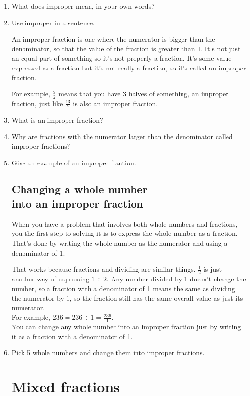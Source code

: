 \documentclass[14pt]{article}
\begin{document}
\begin{enumerate}
\item What does improper mean, in your own words?
\item Use improper in a sentence.

An improper fraction is one where the numerator is bigger than the denominator, so that the value of the fraction is greater than 1. It's not just an equal part of something so it's not properly a fraction. It's some value expressed as a fraction but it's not really a fraction, so it's called an improper fraction.

For example, $\frac{3}{2}$ means that you have 3 halves of something, an improper fraction, just like $\frac{13}{7}$ is also an improper fraction.

\item What is an improper fraction?
\item Why are fractions with the numerator larger than the denominator called improper fractions?
\item Give an example of an improper fraction.

\subsection*{Changing a whole number \\ into an improper fraction}
When you have a problem that involves both whole numbers and fractions, you the first step to solving it is to express the whole number as a fraction. That’s done by writing the whole number as the numerator and using a denominator of 1.

That works because fractions and dividing are similar things. $\frac{1}{2}$ is just another way of expressing $1 \div 2$. Any number divided by 1 doesn't change the number, so a fraction with a denominator of 1 means the same as dividing the numerator by 1, so the fraction still has the same overall value as just its numerator.\\

For example, $236 = 236 \div 1 = \frac{236}{1}$.\\

You can change any whole number into an improper fraction just by writing it as a fraction with a denominator of 1.\\

\item Pick 5 whole numbers and change them into improper fractions.

\section{Mixed fractions}


\end{enumerate}
\end{document}
